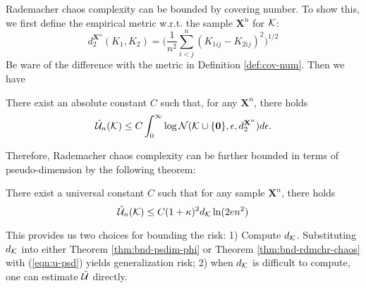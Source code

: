 

Rademacher chaos complexity can be bounded by covering number. To show this, we first define the empirical metric w.r.t. the sample $\mathbf X^n$ for ${\cal K}$:
\begin{equation}
d^{\mathbf X^n}_2(K_1, K_2) = \bigg( \frac{1}{n^2}\sum_{i < j}^n (K_{1ij} - K_{2ij})^2 \bigg)^{1/2}
\label{eqn:d2}
\end{equation}
Be ware of the difference with the metric in Definition \ref{def:cov-num}. Then we have
\begin{theorem} \label{thm:u-cov-num}
There exist an absolute constant $C$ such that, for any $\mathbf X^n$, there holds
\begin{equation}
\eu(\k) \leq C \int_0^\infty\log\mathcal N(\k\cup\{\0\}, \epsilon, d^{\mathbf X^n}_2)d\epsilon. \label{eqn:u-cov-num}
\end{equation}
\end{theorem}

Therefore, Rademacher chaos complexity can be further bounded in terms of
pseudo-dimension by the following theorem:
\begin{theorem} \label{thm:u-pseudo-d}
There exist a universal constant $C$ such that for any sample $\mathbf X^n$, there holds
\begin{equation}
\eu(\k) \leq C(1 + \kappa)^2d_\k\ln(2en^2) \label{eqn:u-psd}
\end{equation}
\end{theorem}
This provides us two choices for bounding the risk: 1) Compute $d_{\cal K}$. Substituting $d_{\cal K}$ into either Theorem \ref{thm:bnd-psdim-phi} or Theorem
\ref{thm:bnd-rdmchr-chaos} with (\ref{eqn:u-psd}) yields generalization risk; 2)
when $d_{\cal K}$ is difficult to compute, one can estimate $\hat{{\cal U}}$ directly.

